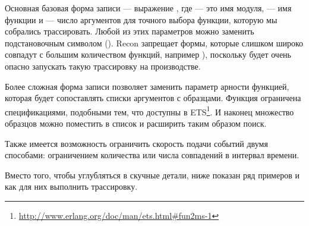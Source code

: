 Основная базовая форма записи --- выражение , где  --- это имя модуля,  --- имя функции и  --- число аргументов для точного выбора функции, которую мы собрались трассировать. Любой из этих параметров можно заменить подстановочным символом (). Recon запрещает формы, которые слишком широко совпадут с большим количеством функций, например ), поскольку будет очень опасно запускать такую трассировку на производстве.

Более сложная форма записи позволяет заменить параметр арности функцией, которая будет сопоставлять списки аргументов с образцами. Функция ограничена спецификациями, подобными тем, что доступны в ETS\footnote{\href{http://www.erlang.org/doc/man/ets.html\#fun2ms-1}{http://www.erlang.org/doc/man/ets.html\#fun2ms-1}}. И наконец множество образцов можно поместить в список и расширить таким образом поиск.

Также имеется возможность ограничить скорость подачи событий двумя способами: ограничением количества или числа совпадений в интервал времени.

Вместо того, чтобы углубляться в скучные детали, ниже показан ряд примеров и как для них выполнить трассировку.


